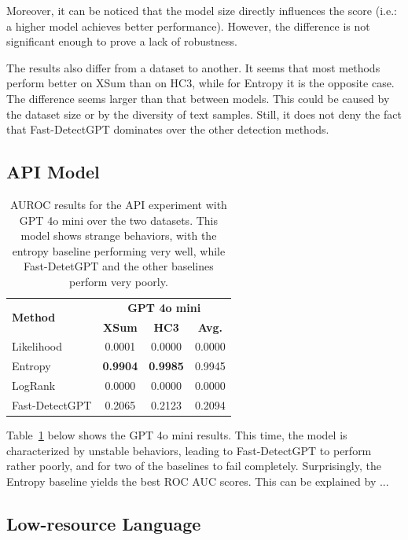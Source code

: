 \documentclass[11pt]{article}
\begin{document}
Moreover, it can be noticed that the model size directly influences the score (i.e.: a higher model achieves better performance). However, the difference is not significant enough to prove a lack of robustness. 

The results also differ from a dataset to another. It seems that most methods perform better on XSum than on HC3, while for Entropy it is the opposite case. The difference seems larger than that between models. This could be caused by the dataset size or by the diversity of text samples. Still, it does not deny the fact that Fast-DetectGPT dominates over the other detection methods.

\subsection{API Model}

\begin{table}[H]
    \centering
    \small
    \begin{tabular}{l|cc|c}
    \toprule
    \multirow{2}{*}{\textbf{Method}} & \multicolumn{3}{c}{\textbf{GPT 4o mini}} \\
    \cmidrule{2-4}
    & \textbf{XSum} & \textbf{HC3} & \textbf{Avg.} \\
    \midrule
    Likelihood & 0.0001 & 0.0000 & 0.0000 \\
    Entropy &  \textbf{0.9904} & \textbf{0.9985} & 0.9945 \\
    LogRank & 0.0000 & 0.0000 & 0.0000 \\
    \midrule
    Fast-DetectGPT & 0.2065 & 0.2123 & 0.2094 \\
    \bottomrule
    \end{tabular}
    \vspace{0.5em}
    \caption{AUROC results for the API experiment with GPT 4o mini over the two datasets. This model shows strange behaviors, with the entropy baseline performing very well, while Fast-DetetGPT and the other baselines perform very poorly. }
    \label{tab:API_results}
\end{table}

Table~\ref{tab:API_results} below shows the GPT 4o mini results. This time, the model is characterized by unstable behaviors, leading to Fast-DetectGPT to perform rather poorly, and for two of the baselines to fail completely. Surprisingly, the Entropy baseline yields the best ROC AUC scores. This can be explained by ... 

\subsection{Low-resource Language}
\end{document}
